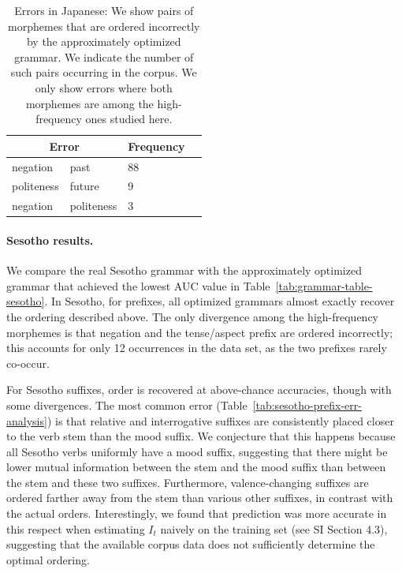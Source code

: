 \begin{table}
    \centering
    \begin{tabular}{ll|ll}
    \multicolumn{2}{c|}{Error} & Frequency \\ \hline\hline
negation & past & 88 \\
politeness & future & 9 \\
negation & politeness & 3 \\
\end{tabular}
    \caption{Errors in Japanese: We show pairs of morphemes that are ordered incorrectly by the approximately optimized grammar.
    We indicate the number of such pairs occurring in the corpus.
    We only show errors where both morphemes are among the high-frequency ones studied here.
    }
    \label{tab:jap-err-analysis}
\end{table}

\paragraph{Sesotho results.} We compare the real Sesotho grammar with the approximately optimized grammar that achieved the lowest AUC value in Table~\ref{tab:grammar-table-sesotho}. %
In Sesotho, for prefixes, all optimized grammars almost exactly recover the ordering described above.
The only divergence among the high-frequency morphemes is that negation and the tense/aspect prefix are ordered incorrectly; this accounts for only 12 occurrences in the data set, as the two prefixes rarely co-occur.

For Sesotho suffixes, order is recovered at above-chance accuracies, though with some divergences.
The most common error (Table~\ref{tab:sesotho-prefix-err-analysis}) is that relative and interrogative suffixes are consistently placed closer to the verb stem than the mood suffix.
We conjecture that this happens because all Sesotho verbs uniformly have a mood suffix, suggesting that there might be lower mutual information between the stem and the mood suffix than between the stem and these two suffixes.
Furthermore, valence-changing suffixes are ordered farther away from the stem than various other suffixes, in contrast with the actual orders.
Interestingly, we found that prediction was more accurate in this respect when estimating $I_t$ naively  on the training set (see SI Section 4.3), suggesting that the available corpus data does not sufficiently determine the optimal ordering.


